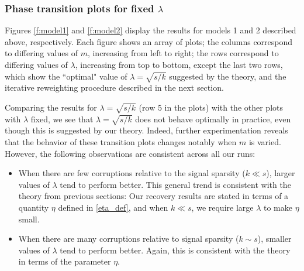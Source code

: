 \subsubsection{Phase transition plots for fixed $\lambda$}

Figures \ref{f:model1} and \ref{f:model2} display the results for models 1 and 2 described above, respectively. Each figure shows an array of plots; the columns correspond to differing values of $m$, increasing from left to right; the rows correspond to differing values of $\lambda$, increasing from top to bottom, except the last two rows, which show the ``optimal" value of $\lambda = \sqrt{s/k}$ suggested by the theory, and the iterative reweighting procedure described in the next section. %

Comparing the results for $\lambda = \sqrt{s/k}$ (row 5 in the plots) with the other plots with $\lambda$ fixed, we see that $\lambda = \sqrt{s/k}$ does not behave optimally in practice, even though this is suggested by our theory. Indeed, further experimentation reveals that the behavior of these transition plots changes notably when $m$ is varied. However, the following observations are consistent across all our runs:
\begin{itemize}
  \item When there are few corruptions relative to the signal sparsity ($k \ll s$), larger values of $\lambda$ tend to perform better. This general trend is consistent with the theory from previous sections: Our recovery results are stated in terms of a quantity $\eta$ defined in \eqref{eta_def}, and when $k \ll s$, we require large $\lambda$ to make $\eta$ small.
  \item When there are many corruptions relative to signal sparsity ($k \sim s$), smaller values of $\lambda$ tend to perform better. Again, this is consistent with the theory in terms of the parameter $\eta$.
\end{itemize}


